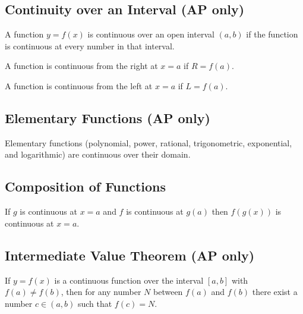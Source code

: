 \subsection{Continuity over an Interval (AP only)}
	A function $y=f(x)$ is continuous over an open interval $(a,b)$ if the function is continuous at every number in that interval.

	A function is continuous from the right at $x=a$ if $R=f(a)$.

	A function is continuous from the left at $x=a$ if $L=f(a)$.
\subsection{Elementary Functions (AP only)}
	Elementary functions (polynomial, power, rational, trigonometric, exponential, and logarithmic) are continuous over their domain.
\subsection{Composition of Functions}
	If $g$ is continuous at $x=a$ and $f$ is continuous at $g(a)$ then $f(g(x))$ is continuous at $x=a$.
\subsection{Intermediate Value Theorem (AP only)}
	If $y=f(x)$ is a continuous function over the interval $[a,b]$ with $f(a) \neq f(b)$, then for any number $N$ between $f(a)$ and $f(b)$ there exist a number $c \in (a,b)$ such that $f(c) = N$.
